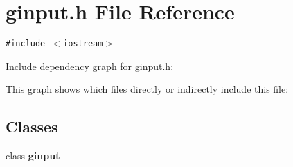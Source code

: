 \section{ginput.h File Reference}
\label{ginput_8h}
{\tt \#include $<$iostream$>$}\par


Include dependency graph for ginput.h:

This graph shows which files directly or indirectly include this file:\subsection*{Classes}
\begin{CompactItemize}
\item 
class \bf{ginput}
\end{CompactItemize}
